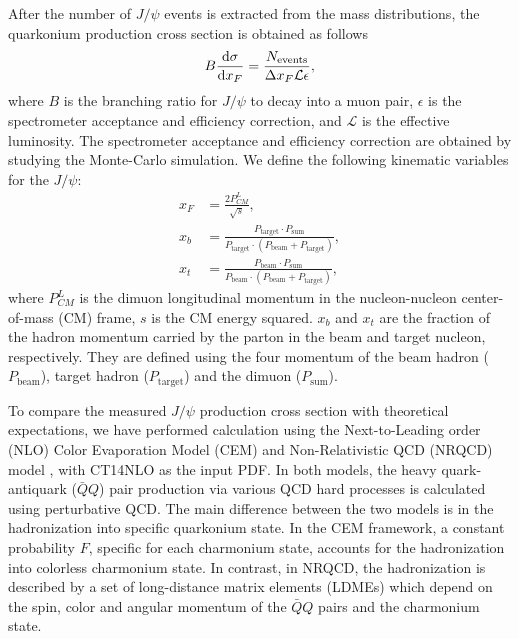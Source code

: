 \documentclass[10pt,a4paper,final]{article}
\begin{document}
After the number of $J/\psi$ events is extracted from the mass distributions,
the quarkonium production cross section is obtained as follows
\begin{equation}
	B\dv{\sigma}{x_F} = \frac{N_{\textrm{events}}}{\Delta x_F \mathcal{L} \epsilon},
\end{equation}
where $B$ is the branching ratio for $J/\psi$ to decay into a muon pair,
$\epsilon$ is the spectrometer acceptance and efficiency correction, and
$\mathcal{L}$ is the effective luminosity. The spectrometer acceptance and
efficiency correction are obtained by studying the Monte-Carlo simulation.
We define the following kinematic variables for the $J/\psi$:
\begin{align}
	x_F & = \frac{2P^L_{CM}}{\sqrt{s}},                                                                                                                                                \\
	x_b & = \frac{ P_{\textrm{target}}\cdot P_{\textrm{sum}}}{ P_{\textrm{target}} \cdot\left( P_{\textrm{beam}}+ P_{\textrm{target}}\right)}, \\
	x_t & = \frac{ P_{\textrm{beam}}\cdot P_{\textrm{sum}}}{ P_{\textrm{beam}} \cdot\left( P_{\textrm{beam}}+ P_{\textrm{target}}\right)},
\end{align}
where $P^L_{CM}$ is the dimuon longitudinal momentum in the nucleon-nucleon
center-of-mass (CM) frame, $s$ is the CM energy squared. $x_b$ and $x_t$ are
the fraction of the hadron momentum carried by the parton in the beam and
target nucleon, respectively. They are defined using the four momentum of
the beam hadron ($ P_{\textrm{beam}}$), target hadron ($ P_{\textrm{target}}$)
and the dimuon ($ P_{\textrm{sum}}$).

To compare the measured $J/\psi$ production cross section with theoretical
expectations, we have performed calculation using the Next-to-Leading
order (NLO) Color Evaporation Model (CEM)\cite{mangano1993} and
Non-Relativistic QCD (NRQCD) model \cite{bodwin1997}, with CT14NLO \cite{dulat2016}
as the input PDF. In both models, the heavy
quark-antiquark ($\bar{Q}Q$) pair production via various QCD hard processes
is calculated using perturbative QCD. The main difference between the two
models is in the hadronization into specific quarkonium state.
In the CEM framework, a constant probability $F$, specific for each charmonium
state, accounts for the hadronization into colorless charmonium state. In contrast,
in NRQCD, the hadronization is described by a set of long-distance matrix elements
(LDMEs) which depend on the spin, color and angular momentum of the $\bar{Q}Q$ pairs
and the charmonium state.
\end{document}
